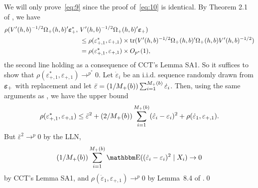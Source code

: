 \documentclass[12pt,fleqn]{article}
\begin{document}
We will only prove~\eqref{eq:9} since the proof of~\eqref{eq:10} is
identical. By Theorem 2.1 of \cite{freedman1981}, we have
\begin{align*}
  \rho(V'(h,b)^{-1/2} \Omega_+(h,b)'\epb_{+}^{*},\
  &V'(h,b)^{-1/2} \Omega_+(h,b)'\epb_{+}) \\
  &\leq \rho(\varepsilon_{+,1}^{*}, \varepsilon_{+,1}) \times
    \tr(V'(h,b)^{-1/2} \Omega_+(h,b)' \Omega_+(h,b)V'(h,b)^{-1/2}) \\
  &= \rho(\varepsilon_{+,1}^{*}, \varepsilon_{+,1}) \times O_{p^{*}}(1),
\end{align*}
the second line holding as a consequence of CCT's Lemma SA1. So it suffices
to show that $\rho(\varepsilon_{+,1}^{*}, \varepsilon_{+,1}) \to^{p^{*}} 0$. Let
$\dot{\varepsilon}_i$ be an i.i.d. sequence randomly drawn from $\epb_+$
with replacement and let
$\bar{\varepsilon} = (1/M_+(b)) \osum[+]{i}{b} \dot{\varepsilon}_i$. Then,
using the same arguments as \cite{freedman1981}, we have the upper bound
\begin{equation*}
  \rho(\varepsilon_{+,1}^*, \varepsilon_{+,1})
  \leq
  \bar\varepsilon^2 +
  (2/M_+(b)) \osum[+]{i}{b} (\hat\varepsilon_i - \varepsilon_i)^2
  + \rho(\dot\varepsilon_1, \varepsilon_{+,1}).
\end{equation*}
But $\bar\varepsilon^2 \to^p 0$ by the LLN,
\[
  (1/M_+(b)) \osum[+]{i}{b}
  \E((\hat\varepsilon_i - \varepsilon_i)^2 \mid X_i) \to 0
\]
by CCT's Lemma SA1, and
$\rho(\dot\varepsilon_1, \varepsilon_{+,1}) \to^p 0$ by Lemma~8.4 of
\cite{bickel1981}.\qed

\clearpage


\end{document}
